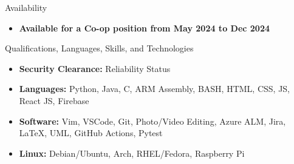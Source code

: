 \documentclass[]{mcdowellcv}
\begin{document}
	\makeheader

	\begin{cvsection}{Availability}
		\begin{cvsubsection}{}{}{}
			\begin{itemize}
				\item \textbf{Available for a Co-op position from May 2024 to Dec 2024}
			\end{itemize}
		\end{cvsubsection}
	\end{cvsection}

	\begin{cvsection}{Qualifications, Languages, Skills, and Technologies}
		\begin{cvsubsection}{}{}{}	
			\begin{itemize}
					\item \textbf{Security Clearance:} Reliability Status
					\item \textbf{Languages:} Python, Java, C, ARM Assembly, BASH, HTML, CSS, JS, React JS, Firebase
					\item \textbf{Software:} Vim, VSCode, Git, Photo/Video Editing, Azure ALM, Jira, \LaTeX, UML, GitHub Actions, Pytest
					\item \textbf{Linux:} Debian/Ubuntu, Arch, RHEL/Fedora, Raspberry Pi 
			\end{itemize}
		\end{cvsubsection}
	\end{cvsection}
\end{document}
